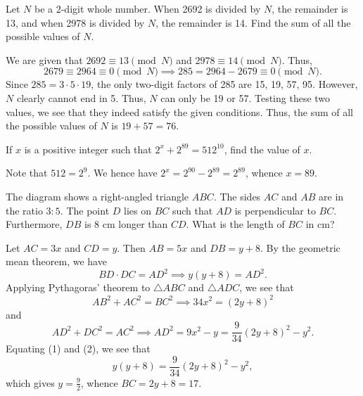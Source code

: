 \begin{question}[76]\label{Q::2024-J-1-6}
    Let $N$ be a 2-digit whole number. When 2692 is divided by $N$, the remainder is 13, and when 2978 is divided by $N$, the remainder is 14. Find the sum of all the possible values of $N$.
\end{question}
\begin{solution*}
    We are given that $2692 \equiv 13 \pmod{N}$ and $2978 \equiv 14 \pmod{N}$. Thus, \[2679 \equiv 2964 \equiv 0 \pmod{N} \implies 285 = 2964 - 2679 \equiv 0 \pmod{N}.\] Since $285 = 3 \cdot 5 \cdot 19$, the only two-digit factors of 285 are 15, 19, 57, 95. However, $N$ clearly cannot end in 5. Thus, $N$ can only be 19 or 57. Testing these two values, we see that they indeed satisfy the given conditions. Thus, the sum of all the possible values of $N$ is $19 + 57 = 76$.
\end{solution*}

\begin{question}[89]\label{Q::2024-J-1-7}
    If $x$ is a positive integer such that $2^x + 2^{89} = 512^{10}$, find the value of $x$.
\end{question}
\begin{solution*}
    Note that $512 = 2^{9}$. We hence have $2^x = 2^{90} - 2^{89} = 2^{89}$, whence $x = 89$.
\end{solution*}

\begin{question}[17]\label{Q::2024-J-1-8}
    The diagram shows a right-angled triangle $ABC$. The sides $AC$ and $AB$ are in the ratio $3:5$. The point $D$ lies on $BC$ such that $AD$ is perpendicular to $BC$. Furthermore, $DB$ is 8 cm longer than $CD$. What is the length of $BC$ in cm?
    
    \begin{center}
    \end{center}
\end{question}
\begin{solution*}
    Let $AC = 3x$ and $CD = y$. Then $AB = 5x$ and $DB = y + 8$. By the geometric mean theorem, we have \[BD \cdot DC = AD^2 \implies y(y+8) = AD^2. \tag{1}\] Applying Pythagoras' theorem to $\triangle ABC$ and $\triangle ADC$, we see that \[AB^2 + AC^2 = BC^2 \implies 34x^2 = (2y + 8)^2\] and \[AD^2 + DC^2 = AC^2 \implies AD^2 = 9x^2 - y = \frac{9}{34}(2y + 8)^2 - y^2. \tag{2}\] Equating (1) and (2), we see that \[y(y + 8) = \frac{9}{34}(2y + 8)^2 - y^2,\] which gives $y = \frac92$, whence $BC = 2y + 8 = 17$.
\end{solution*}

